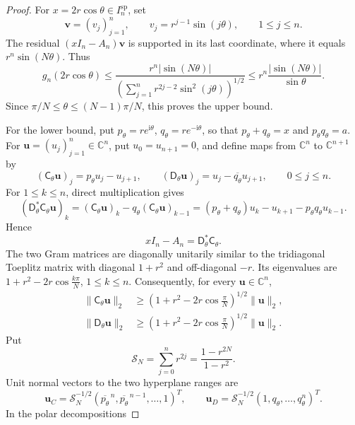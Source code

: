 \documentclass[12pt,anonymous]{iopjournal}
\numberwithin{equation}{section}
\theoremstyle{remark}
\newcommand{\C}{\mathbb C}
\newcommand{\ii}{\mathrm i}
\begin{document}
\begin{proof}
For \(x=2r\cos\theta\in I_n^{\mathrm{sp}}\), set
\[
 \boldsymbol v=(v_j)_{j=1}^n,\qquad
 v_j=r^{j-1}\sin(j\theta),\qquad1\leq j\leq n.
\]
The residual \((xI_n-A_n)\boldsymbol v\) is supported in its last
coordinate, where it equals \(r^n\sin(N\theta)\).  Thus
\[
 g_n(2r\cos\theta)
 \leq\frac{r^n|\sin(N\theta)|}
 {\left(\sum_{j=1}^nr^{2j-2}\sin^2(j\theta)\right)^{1/2}}
 \leq r^n\frac{|\sin(N\theta)|}{\sin\theta}.
\]
Since \(\pi/N\leq\theta\leq(N-1)\pi/N\), this proves the upper bound.

For the lower bound, put
\(p_\theta=re^{\ii\theta}\), \(q_\theta=re^{-\ii\theta}\), so that
\(p_\theta+q_\theta=x\) and \(p_\theta q_\theta=a\).  For
\(\boldsymbol u=(u_j)_{j=1}^n\in\C^n\), put \(u_0=u_{n+1}=0\), and
define maps from \(\C^n\) to \(\C^{n+1}\) by
\[
 (\mathsf{C}_\theta\boldsymbol u)_j=p_\theta u_j-u_{j+1},\qquad
 (\mathsf{D}_\theta\boldsymbol u)_j=u_j-\overline{q_\theta}u_{j+1},
 \qquad0\leq j\leq n.
\]
For \(1\leq k\leq n\), direct multiplication gives
\[
 (\mathsf{D}_\theta^*\mathsf{C}_\theta\boldsymbol u)_k
 =(\mathsf{C}_\theta\boldsymbol u)_k
 -q_\theta(\mathsf{C}_\theta\boldsymbol u)_{k-1}
 =(p_\theta+q_\theta)u_k-u_{k+1}-p_\theta q_\theta u_{k-1}.
\]
Hence
\begin{equation}\label{eq:rectangular-factorization}
 xI_n-A_n=\mathsf{D}_\theta^*\mathsf{C}_\theta.
\end{equation}
The two Gram matrices are
diagonally unitarily similar to the tridiagonal Toeplitz matrix with
diagonal \(1+r^2\) and off-diagonal \(-r\).  Its eigenvalues are
\(1+r^2-2r\cos\frac{k\pi}{N}\), \(1\leq k\leq n\).  Consequently, for
every \(\boldsymbol u\in\C^n\),
\begin{equation}\label{eq:rectangular-min}
 \begin{aligned}
  \lVert\mathsf C_\theta\boldsymbol u\rVert_2
  &\geq \left(1+r^2-2r\cos\frac{\pi}{N}\right)^{1/2}
    \lVert\boldsymbol u\rVert_2,\\
  \lVert\mathsf D_\theta\boldsymbol u\rVert_2
  &\geq \left(1+r^2-2r\cos\frac{\pi}{N}\right)^{1/2}
    \lVert\boldsymbol u\rVert_2.
 \end{aligned}
\end{equation}
Put
\[
 \mathcal S_N=\sum_{j=0}^nr^{2j}=\frac{1-r^{2N}}{1-r^2}.
\]
Unit normal vectors to the two hyperplane ranges are
\[
 \boldsymbol u_C=\mathcal S_N^{-1/2}
 (\overline{p_\theta}^{\,n},\overline{p_\theta}^{\,n-1},\ldots,1)^T,
 \qquad
 \boldsymbol u_D=\mathcal S_N^{-1/2}(1,q_\theta,\ldots,q_\theta^n)^T.
\]
In the polar decompositions

\end{proof}
\end{document}

